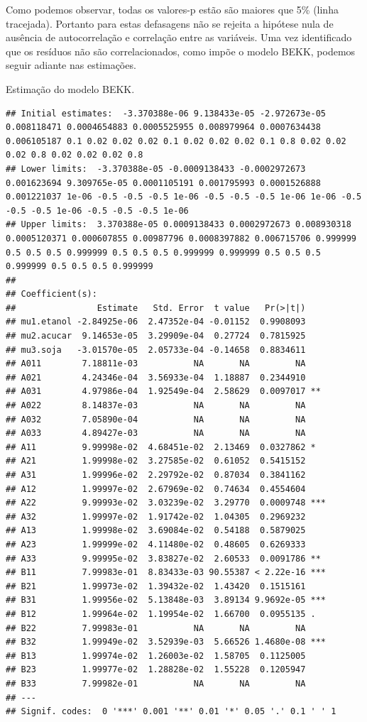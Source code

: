 Como podemos observar, todas os valores-p estão são maiores que 5\%
(linha tracejada). Portanto para estas defasagens não se rejeita a
hipótese nula de ausência de autocorrelação e correlação entre as
variáveis. Uma vez identificado que os resíduos não são correlacionados,
como impõe o modelo BEKK, podemos seguir adiante nas estimações.

Estimação do modelo BEKK.

\begin{verbatim}
## Initial estimates:  -3.370388e-06 9.138433e-05 -2.972673e-05 0.008118471 0.0004654883 0.0005525955 0.008979964 0.0007634438 0.006105187 0.1 0.02 0.02 0.02 0.1 0.02 0.02 0.02 0.1 0.8 0.02 0.02 0.02 0.8 0.02 0.02 0.02 0.8 
## Lower limits:  -3.370388e-05 -0.0009138433 -0.0002972673 0.001623694 9.309765e-05 0.0001105191 0.001795993 0.0001526888 0.001221037 1e-06 -0.5 -0.5 -0.5 1e-06 -0.5 -0.5 -0.5 1e-06 1e-06 -0.5 -0.5 -0.5 1e-06 -0.5 -0.5 -0.5 1e-06 
## Upper limits:  3.370388e-05 0.0009138433 0.0002972673 0.008930318 0.0005120371 0.000607855 0.00987796 0.0008397882 0.006715706 0.999999 0.5 0.5 0.5 0.999999 0.5 0.5 0.5 0.999999 0.999999 0.5 0.5 0.5 0.999999 0.5 0.5 0.5 0.999999 
## 
## Coefficient(s):
##                Estimate   Std. Error  t value   Pr(>|t|)    
## mu1.etanol -2.84925e-06  2.47352e-04 -0.01152  0.9908093    
## mu2.acucar  9.14653e-05  3.29909e-04  0.27724  0.7815925    
## mu3.soja   -3.01570e-05  2.05733e-04 -0.14658  0.8834611    
## A011        7.18811e-03           NA       NA         NA    
## A021        4.24346e-04  3.56933e-04  1.18887  0.2344910    
## A031        4.97986e-04  1.92549e-04  2.58629  0.0097017 ** 
## A022        8.14837e-03           NA       NA         NA    
## A032        7.05890e-04           NA       NA         NA    
## A033        4.89427e-03           NA       NA         NA    
## A11         9.99998e-02  4.68451e-02  2.13469  0.0327862 *  
## A21         1.99998e-02  3.27585e-02  0.61052  0.5415152    
## A31         1.99996e-02  2.29792e-02  0.87034  0.3841162    
## A12         1.99997e-02  2.67969e-02  0.74634  0.4554604    
## A22         9.99993e-02  3.03239e-02  3.29770  0.0009748 ***
## A32         1.99997e-02  1.91742e-02  1.04305  0.2969232    
## A13         1.99998e-02  3.69084e-02  0.54188  0.5879025    
## A23         1.99999e-02  4.11480e-02  0.48605  0.6269333    
## A33         9.99995e-02  3.83827e-02  2.60533  0.0091786 ** 
## B11         7.99983e-01  8.83433e-03 90.55387 < 2.22e-16 ***
## B21         1.99973e-02  1.39432e-02  1.43420  0.1515161    
## B31         1.99956e-02  5.13848e-03  3.89134 9.9692e-05 ***
## B12         1.99964e-02  1.19954e-02  1.66700  0.0955135 .  
## B22         7.99983e-01           NA       NA         NA    
## B32         1.99949e-02  3.52939e-03  5.66526 1.4680e-08 ***
## B13         1.99974e-02  1.26003e-02  1.58705  0.1125005    
## B23         1.99977e-02  1.28828e-02  1.55228  0.1205947    
## B33         7.99982e-01           NA       NA         NA    
## ---
## Signif. codes:  0 '***' 0.001 '**' 0.01 '*' 0.05 '.' 0.1 ' ' 1
\end{verbatim}

